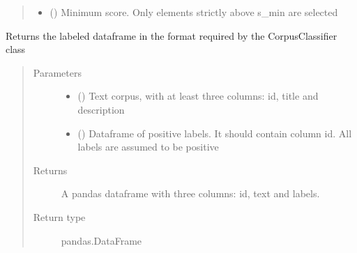 \documentclass[letterpaper,10pt,english]{sphinxmanual}
\begin{document}
\begin{fulllineitems}
\begin{fulllineitems}
\begin{quote}
\begin{description}
\begin{itemize}
\item {} 
\sphinxAtStartPar
{} () \textendash{} Minimum score. Only elements strictly above s\_min are selected

\end{itemize}

\end{description}\end{quote}

\end{fulllineitems}


\begin{fulllineitems}
\label{\detokenize{dc_preprocessor:src.domain_classifier.preprocessor.CorpusDFProcessor.make_PU_dataset}}
\sphinxAtStartPar
Returns the labeled dataframe in the format required by the
CorpusClassifier class
\begin{quote}\begin{description}
\item[{Parameters}] \leavevmode\begin{itemize}
\item {} 
\sphinxAtStartPar
{} () \textendash{} Text corpus, with at least three columns: id, title and description

\item {} 
\sphinxAtStartPar
{} () \textendash{} Dataframe of positive labels. It should contain column id. All
labels are assumed to be positive

\end{itemize}

\item[{Returns}] \leavevmode
\sphinxAtStartPar
{} \textendash{} A pandas dataframe with three columns: id, text and labels.

\item[{Return type}] \leavevmode
\sphinxAtStartPar
pandas.DataFrame

\end{description}\end{quote}


\end{fulllineitems}
\end{fulllineitems}
\end{document}
